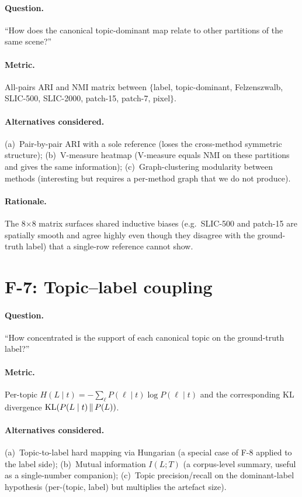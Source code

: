 \documentclass[11pt,a4paper]{article}
\begin{document}
\paragraph{Question.} ``How does the canonical topic-dominant map
relate to other partitions of the same scene?''

\paragraph{Metric.} All-pairs ARI and NMI matrix between $\{$label,
topic-dominant, Felzenszwalb, SLIC-500, SLIC-2000, patch-15,
patch-7, pixel$\}$.

\paragraph{Alternatives considered.} (a)~Pair-by-pair ARI with a
sole reference (loses the cross-method symmetric structure);
(b)~V-measure heatmap (V-measure equals NMI on these partitions
and gives the same information); (c)~Graph-clustering modularity
between methods (interesting but requires a per-method graph
that we do not produce).

\paragraph{Rationale.} The 8$\times$8 matrix surfaces shared
inductive biases (e.g.\ SLIC-500 and patch-15 are spatially smooth
and agree highly even though they disagree with the ground-truth
label) that a single-row reference cannot show.

\section{F-7: Topic--label coupling}

\paragraph{Question.} ``How concentrated is the support of each
canonical topic on the ground-truth label?''

\paragraph{Metric.} Per-topic
$H(L \mid t) = -\sum_\ell P(\ell \mid t) \log P(\ell \mid t)$ and
the corresponding KL divergence $\mathrm{KL}\!\left(P(L \mid t) \,\middle\|\, P(L)\right)$.

\paragraph{Alternatives considered.} (a)~Topic-to-label hard
mapping via Hungarian (a special case of F-8 applied to the label
side); (b)~Mutual information $I(L; T)$ (a corpus-level summary,
useful as a single-number companion); (c)~Topic precision/recall on
the dominant-label hypothesis (per-(topic, label) but multiplies
the artefact size).
\end{document}
